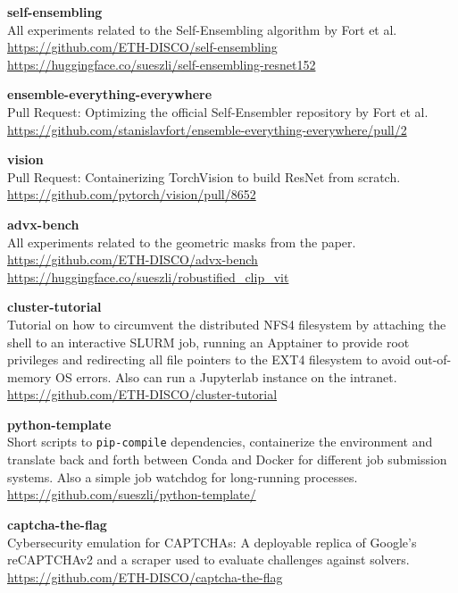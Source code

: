 \documentclass[a4paper, oneside]{discothesis}
\newcommand{\linebreaks}{\vspace*{0.5em}}
\begin{document}
\textbf{self-ensembling} \\
All experiments related to the Self-Ensembling algorithm by Fort et al. \\
\url{https://github.com/ETH-DISCO/self-ensembling} \\
\url{https://huggingface.co/sueszli/self-ensembling-resnet152}

\linebreaks

\textbf{ensemble-everything-everywhere} \\
Pull Request: Optimizing the official Self-Ensembler repository by Fort et al. \\
\url{https://github.com/stanislavfort/ensemble-everything-everywhere/pull/2}

\linebreaks

\textbf{vision} \\
Pull Request: Containerizing TorchVision to build ResNet from scratch. \\
\url{https://github.com/pytorch/vision/pull/8652}

\linebreaks

\textbf{advx-bench} \\
All experiments related to the geometric masks from the paper. \\
\url{https://github.com/ETH-DISCO/advx-bench} \\
\url{https://huggingface.co/sueszli/robustified_clip_vit}

\linebreaks

\textbf{cluster-tutorial} \\
Tutorial on how to circumvent the distributed NFS4 filesystem by attaching the shell to an interactive SLURM job, running an Apptainer to provide root privileges and redirecting all file pointers to the EXT4 filesystem to avoid out-of-memory OS errors. Also can run a Jupyterlab instance on the intranet. \\
\url{https://github.com/ETH-DISCO/cluster-tutorial}

\linebreaks

\textbf{python-template} \\
Short scripts to \texttt{pip-compile} dependencies, containerize the environment and translate back and forth between Conda and Docker for different job submission systems. Also a simple job watchdog for long-running processes. \\ 
\url{https://github.com/sueszli/python-template/}

\linebreaks

\textbf{captcha-the-flag} \\
Cybersecurity emulation for CAPTCHAs: A deployable replica of Google's reCAPTCHAv2 and a scraper used to evaluate challenges against solvers. \\
\url{https://github.com/ETH-DISCO/captcha-the-flag}
\end{document}
